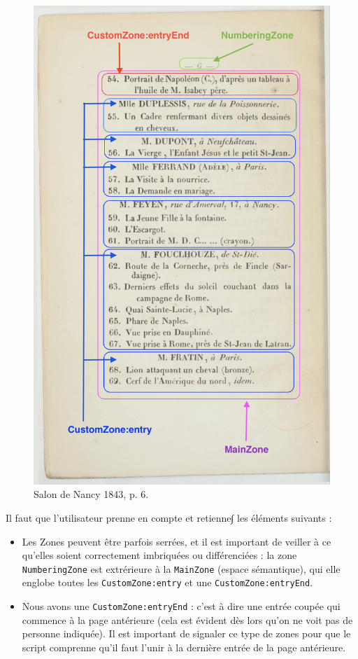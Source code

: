 \documentclass[a4paper,12pt,twoside]{book}
\begin{document}
\begin{figure}[ht]
	\centering
	\includegraphics[scale=0.5]{exemples_zones.png}		
	\caption{Salon de Nancy 1843, p. 6.}
	\label{segmonto}
\end{figure}

Il faut que l'utilisateur prenne en compte et retienne∫ les éléments suivants :

\begin{itemize}
	\item Les Zones peuvent être parfois serrées, et il est important de veiller à ce qu'elles soient correctement imbriquées ou différenciées : la zone \texttt{NumberingZone} est extrérieure à la \texttt{MainZone} (espace sémantique), qui elle englobe toutes les \texttt{CustomZone:entry} et une \texttt{CustomZone:entryEnd}.
	
	\item Nous avons une \texttt{CustomZone:entryEnd} : c'est à dire une entrée coupée qui commence à la page antérieure (cela est évident dès lors qu'on ne voit pas de personne indiquée). Il est important de signaler ce type de zones pour que le script comprenne qu'il faut l'unir à la dernière entrée de la page antérieure.
\end{itemize}
\end{document}
